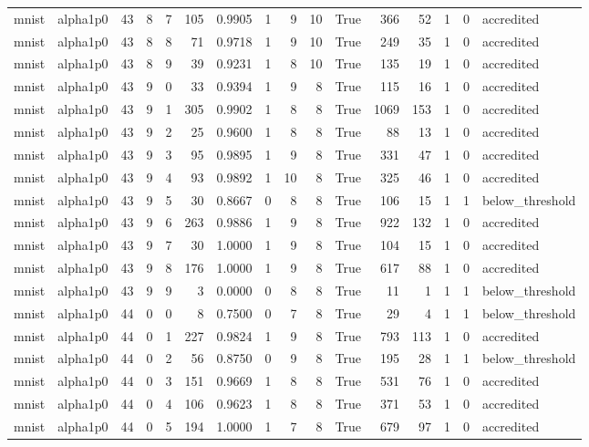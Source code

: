 \begin{tabular}{llrrrrrrrrrrrrrl}
mnist & alpha1p0 & 43 & 8 & 7 & 105 & 0.9905 & 1 & 9 & 10 & True & 366 & 52 & 1 & 0 & accredited \\
mnist & alpha1p0 & 43 & 8 & 8 & 71 & 0.9718 & 1 & 9 & 10 & True & 249 & 35 & 1 & 0 & accredited \\
mnist & alpha1p0 & 43 & 8 & 9 & 39 & 0.9231 & 1 & 8 & 10 & True & 135 & 19 & 1 & 0 & accredited \\
mnist & alpha1p0 & 43 & 9 & 0 & 33 & 0.9394 & 1 & 9 & 8 & True & 115 & 16 & 1 & 0 & accredited \\
mnist & alpha1p0 & 43 & 9 & 1 & 305 & 0.9902 & 1 & 8 & 8 & True & 1069 & 153 & 1 & 0 & accredited \\
mnist & alpha1p0 & 43 & 9 & 2 & 25 & 0.9600 & 1 & 8 & 8 & True & 88 & 13 & 1 & 0 & accredited \\
mnist & alpha1p0 & 43 & 9 & 3 & 95 & 0.9895 & 1 & 9 & 8 & True & 331 & 47 & 1 & 0 & accredited \\
mnist & alpha1p0 & 43 & 9 & 4 & 93 & 0.9892 & 1 & 10 & 8 & True & 325 & 46 & 1 & 0 & accredited \\
mnist & alpha1p0 & 43 & 9 & 5 & 30 & 0.8667 & 0 & 8 & 8 & True & 106 & 15 & 1 & 1 & below\_threshold \\
mnist & alpha1p0 & 43 & 9 & 6 & 263 & 0.9886 & 1 & 9 & 8 & True & 922 & 132 & 1 & 0 & accredited \\
mnist & alpha1p0 & 43 & 9 & 7 & 30 & 1.0000 & 1 & 9 & 8 & True & 104 & 15 & 1 & 0 & accredited \\
mnist & alpha1p0 & 43 & 9 & 8 & 176 & 1.0000 & 1 & 9 & 8 & True & 617 & 88 & 1 & 0 & accredited \\
mnist & alpha1p0 & 43 & 9 & 9 & 3 & 0.0000 & 0 & 8 & 8 & True & 11 & 1 & 1 & 1 & below\_threshold \\
mnist & alpha1p0 & 44 & 0 & 0 & 8 & 0.7500 & 0 & 7 & 8 & True & 29 & 4 & 1 & 1 & below\_threshold \\
mnist & alpha1p0 & 44 & 0 & 1 & 227 & 0.9824 & 1 & 9 & 8 & True & 793 & 113 & 1 & 0 & accredited \\
mnist & alpha1p0 & 44 & 0 & 2 & 56 & 0.8750 & 0 & 9 & 8 & True & 195 & 28 & 1 & 1 & below\_threshold \\
mnist & alpha1p0 & 44 & 0 & 3 & 151 & 0.9669 & 1 & 8 & 8 & True & 531 & 76 & 1 & 0 & accredited \\
mnist & alpha1p0 & 44 & 0 & 4 & 106 & 0.9623 & 1 & 8 & 8 & True & 371 & 53 & 1 & 0 & accredited \\
mnist & alpha1p0 & 44 & 0 & 5 & 194 & 1.0000 & 1 & 7 & 8 & True & 679 & 97 & 1 & 0 & accredited \\

\end{tabular}
